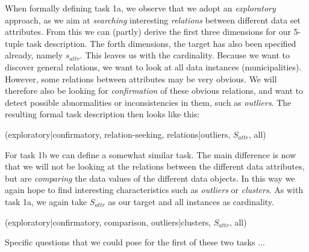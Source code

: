 When formally defining task 1a, we observe that we adopt an \textit{exploratory} approach, as we aim at \textit{searching} interesting \textit{relations} between different data set attributes. From this we can (partly) derive the first three dimensions for our 5-tuple task description. The forth dimensions, the target has also been specified already, namely $s_{attr}$. This leaves us with the cardinality. Because we want to discover general relations, we want to look at all data instances (municipalities). However, some relations between attributes may be very obvious. We will therefore also be looking for \textit{confirmation} of these obvious relations, and want to detect possible abnormalities or inconsistencies in them, such as \textit{outliers}. The resulting formal task description then looks like this:

(exploratory|confirmatory, relation-seeking, relations|outliers, $S_{attr}$, all)

For task 1b we can define a somewhat similar task. The main difference is now that we will not be looking at the relations between the different data attributes, but are \textit{comparing} the data values of the different data objects. In this way we again hope to find interesting characteristics such as \textit{outliers} or \textit{clusters}. As with task 1a, we again take $S_{attr}$ as our target and all instances as cardinality.

(exploratory|confirmatory, comparison, outliers|clusters, $S_{attr}$, all)

Specific questions that we could pose for the first of these two tasks ...








